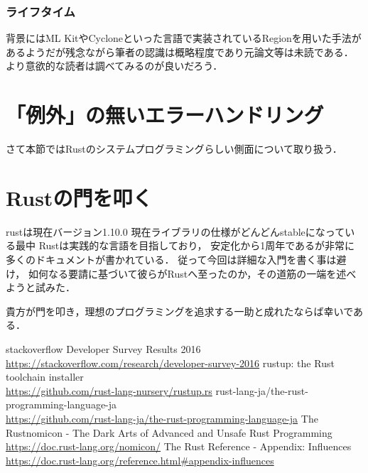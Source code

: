 \subsubsection{ライフタイム}
背景にはML KitやCycloneといった言語で実装されているRegionを用いた手法があるようだが残念ながら筆者の認識は概略程度であり元論文等は未読である．
より意欲的な読者は調べてみるのが良いだろう．


\section{「例外」の無いエラーハンドリング}
さて本節ではRustのシステムプログラミングらしい側面について取り扱う．

\section{Rustの門を叩く}
rustは現在バージョン1.10.0
現在ライブラリの仕様がどんどんstableになっている最中
Rustは実践的な言語を目指しており，
安定化から1周年であるが非常に多くのドキュメントが書かれている．
従って今回は詳細な入門を書く事は避け，
如何なる要請に基づいて彼らがRustへ至ったのか，その道筋の一端を述べようと試みた．

貴方が門を叩き，理想のプログラミングを追求する一助と成れたならば幸いである．

\begin{thebibliography}{9}
 stackoverflow Developer Survey Results 2016 \\
  \url{https://stackoverflow.com/research/developer-survey-2016}
 rustup: the Rust toolchain installer \\
  \url{https://github.com/rust-lang-nursery/rustup.rs}
 rust-lang-ja/the-rust-programming-language-ja \\
  \url{https://github.com/rust-lang-ja/the-rust-programming-language-ja}
 The Rustnomicon - The Dark Arts of Advanced and Unsafe Rust Programming \\
  \url{https://doc.rust-lang.org/nomicon/}
 The Rust Reference - Appendix: Influences \\
  \url{https://doc.rust-lang.org/reference.html#appendix-influences}
\end{thebibliography}
